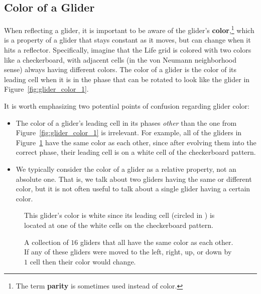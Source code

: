 \subsection{Color of a Glider}\label{sec:glider_color}

When reflecting a glider, it is important to be aware of the glider's \textbf{color},\footnote{The term \textbf{parity} is sometimes used instead of color.} which is a property of a glider that stays constant as it moves, but can change when it hits a reflector. Specifically, imagine that the Life grid is colored with two colors like a checkerboard, with adjacent cells (in the von Neumann neighborhood sense) always having different colors. The color of a glider is the color of its leading cell when it is in the phase that can be rotated to look like the glider in Figure~\ref{fig:glider_color_1}.

It is worth emphasizing two potential points of confusion regarding glider color:\medskip

\begin{itemize}
	\item The color of a glider's leading cell in its phases \emph{other} than the one from Figure~\ref{fig:glider_color_1} is irrelevant. For example, all of the gliders in Figure~\ref{fig:glider_color} have the same color as each other, since after evolving them into the correct phase, their leading cell is on a white cell of the checkerboard pattern.\smallskip
	
	\item We typically consider the color of a glider as a relative property, not an absolute one. That is, we talk about two gliders having the same or different color, but it is not often useful to talk about a single glider having a certain color.\medskip
\end{itemize}

\begin{figure}[!htb]
	\centering
	\begin{minipage}[b]{.3\textwidth}
		\centering{}
		\caption{This glider's color is white since its leading cell (circled in ) is located at one of the white cells on the checkerboard pattern.}\label{fig:glider_color_1}
	\end{minipage} \hfill %
	\begin{minipage}[b]{.66\textwidth}
		\centering
		\caption{A collection of $16$ gliders that all have the same color as each other. If any of these gliders were moved to the left, right, up, or down by $1$ cell then their color would change.}\label{fig:glider_color}
	\end{minipage}
\end{figure}

